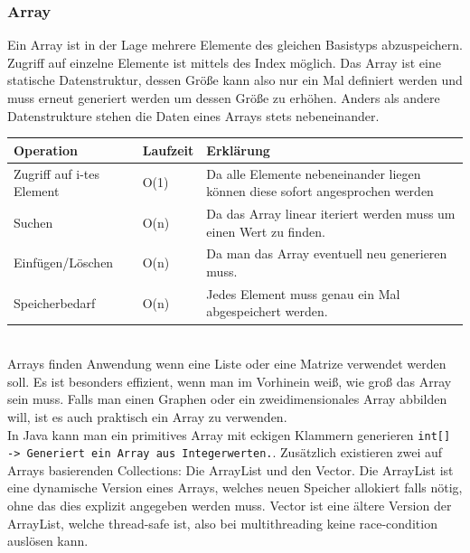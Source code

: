 \documentclass{article}
\begin{document}
	\subsubsection{Array}
	Ein Array ist in der Lage mehrere Elemente des gleichen Basistyps abzuspeichern. Zugriff auf einzelne Elemente ist mittels des Index möglich. Das Array ist eine statische Datenstruktur, dessen Größe kann also nur ein Mal definiert werden und muss erneut generiert werden um dessen Größe zu erhöhen. Anders als andere Datenstrukture stehen die Daten eines Arrays stets nebeneinander. \\
	\begin{tabular}{| l | l | l |}
		\toprule
		Operation & Laufzeit & Erklärung \\ \midrule
		Zugriff auf i-tes Element & O(1) & Da alle Elemente nebeneinander liegen können diese sofort angesprochen werden \\ \hline
		Suchen & O(n) & Da das Array linear iteriert werden muss um einen Wert zu finden. \\ \hline
		Einfügen/Löschen & O(n) & Da man das Array eventuell neu generieren muss. \\ \hline
		Speicherbedarf & O(n) & Jedes Element muss genau ein Mal abgespeichert werden.\\
		\bottomrule
	\end{tabular} \\
	Arrays finden Anwendung wenn eine Liste oder eine Matrize verwendet werden soll. Es ist besonders effizient, wenn man im Vorhinein weiß, wie groß das Array sein muss. Falls man einen Graphen oder ein zweidimensionales Array abbilden will, ist es auch praktisch ein Array zu verwenden. \\
	In Java kann man ein primitives Array mit eckigen Klammern generieren \texttt{int[] -> Generiert ein Array aus Integerwerten.}. Zusätzlich existieren zwei auf Arrays basierenden Collections: Die ArrayList und den Vector. Die ArrayList ist eine dynamische Version eines Arrays, welches neuen Speicher allokiert falls nötig, ohne das dies explizit angegeben werden muss. Vector ist eine ältere Version der ArrayList, welche thread-safe ist, also bei multithreading keine race-condition auslösen kann. \\
\end{document}
